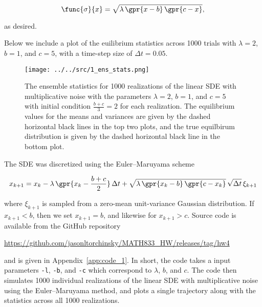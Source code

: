 \begin{equation}
	\func{\sigma}{x} = \sqrt{\lambda\,\gpr{x - b}\,\gpr{c - x}},
\end{equation}

as desired.

Below we include a plot of the euilibrium statistics across 1000 trials with $\lambda = 2$, $b = 1$, and $c = 5$, with a time-step size of $\Delta t = 0.05$. 

\begin{figure}[H]
	\centering
	\texttt{[image: ../../src/1\_ens\_stats.png]}
	\caption{The ensemble statistics for 1000 realizations of the linear SDE with multiplicative noise with the parameters $\lambda = 2$, $b = 1$, and $c = 5$ with initial condition $\frac{b + c}{3} = 2$ for each realization. The equilibrium values for the means and variances are given by the dashed horizontal black lines in the top two plots, and the true equilbirum distribution is given by the dashed horizontal black line in the bottom plot.}
	\label{fig:1_ens_stats}
\end{figure}

The SDE was discretized using the Euler--Maruyama scheme

\begin{equation}
	x_{k+1} = x_{k} - \lambda\,\gpr{x_{k} - \frac{b + c}{2}}\,\Delta t + \sqrt{\lambda\,\gpr{x_{k} - b}\,\gpr{c - x_{k}}}\,\sqrt{\Delta t}\,\xi_{k+1}
\end{equation}

where $\xi_{k+1}$ is sampled from a zero-mean unit-variance Gaussian distribution. If $x_{k+1} < b$, then we set $x_{k+1} = b$, and likewise for $x_{k+1} > c$. Source code is available from the GitHub repository
	
	\begin{center}
		\url{https://github.com/jasonltorchinsky/MATH833_HW/releases/tag/hw4}
	\end{center}

	and is given in Appendix~\ref{app:code_1}. In short, the code takes a input parameters \texttt{-l}, \texttt{-b}, and \texttt{-c} which correspond to $\lambda$, $b$, and $c$. The code then simulates 1000 individual realizations of the linear SDE with multiplicative noise using the Euler--Maruyama method, and plots a single trajectory along with the statistics across all 1000 realizations.
	

